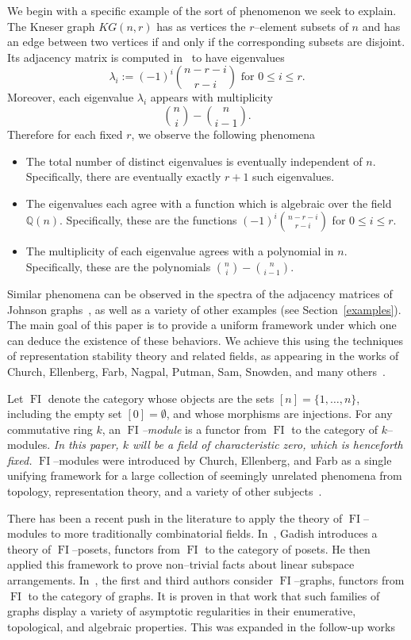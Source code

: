 \documentclass[10pt]{amsart}
\DeclareMathOperator{\FI}{FI}
\newcommand{\Q}{\mathbb{Q}}
\theoremstyle{definition}
\begin{document}
We begin with a specific example of the sort of phenomenon we seek to explain. 
The Kneser graph $KG(n,r)$ has as vertices the $r$--element subsets of $n$ and has an edge between two vertices if and only if the corresponding subsets are disjoint.
Its adjacency matrix is computed in~\cite[Section~9.4]{GR} to have eigenvalues
\[
\lambda_i := (-1)^i\binom{n-r-i}{r-i} \mbox{ for } 0 \leq i \leq r.
\]
 Moreover, each eigenvalue $\lambda_i$ appears with multiplicity 
\[
\binom{n}{i} - \binom{n}{i-1}.
\]
Therefore for each fixed $r$, we observe the following phenomena
\begin{itemize}
\item The total number of distinct eigenvalues is eventually independent of $n$. Specifically, there are eventually exactly $r+1$ such eigenvalues.
\item The eigenvalues each agree with a function which is algebraic over the field $\Q(n)$. Specifically, these are the functions $(-1)^i\binom{n-r-i}{r-i}$ for $0 \leq i \leq r$.
\item The multiplicity of each eigenvalue agrees with a polynomial in $n$. Specifically, these are the polynomials $\binom{n}{i} - \binom{n}{i-1}$.
\end{itemize}
Similar phenomena can be observed in the spectra of the adjacency matrices of Johnson graphs~\cite{BCN}, as well as a variety of other examples (see Section~\ref{examples}). The main goal of this paper is to provide a uniform framework under which one can deduce the existence of these behaviors. We achieve this using the techniques of representation stability theory and related fields, as appearing in the works of Church, Ellenberg, Farb, Nagpal, Putman, Sam, Snowden, and many others~\cite{CEF,CEFN,CF,P,SS}.

Let $\FI$ denote the category whose objects are the sets $[n] = \{1,\ldots, n\}$, including the empty set $[0] = \emptyset$, and whose morphisms are injections. For any commutative ring $k$, an \emph{$\FI$--module} is a functor from $\FI$ to the category of $k$--modules. \emph{In this paper, $k$ will be a field of characteristic zero, which is henceforth fixed.} $\FI$--modules were introduced by Church, Ellenberg, and Farb as a single unifying framework for a large collection of seemingly unrelated phenomena from topology, representation theory, and a variety of other subjects~\cite{CEF}.

There has been a recent push in the literature to apply the theory of $\FI$--modules to more traditionally combinatorial fields. In~\cite{G}, Gadish introduces a theory of $\FI$--posets, functors from $\FI$ to the category of posets. He then applied this framework to prove non--trivial facts about linear subspace arrangements. In~\cite{RW}, the first and third authors consider $\FI$--graphs, functors from $\FI$ to the category of graphs. It is proven in that work that such families of graphs display a variety of asymptotic regularities in their enumerative, topological, and algebraic properties. This was expanded in the follow-up works~\cite{R2,RW2}
\end{document}
